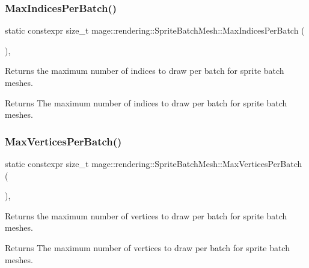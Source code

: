 \subsubsection{\texorpdfstring{Max\+Indices\+Per\+Batch()}{MaxIndicesPerBatch()}}
{\footnotesize\ttfamily static constexpr size\+\_\+t mage\+::rendering\+::\+Sprite\+Batch\+Mesh\+::\+Max\+Indices\+Per\+Batch (\begin{DoxyParamCaption}{ }\end{DoxyParamCaption})\hspace{0.3cm}{\ttfamily [static]}, {\ttfamily [noexcept]}}

Returns the maximum number of indices to draw per batch for sprite batch meshes.

\begin{DoxyReturn}{Returns}
The maximum number of indices to draw per batch for sprite batch meshes. 
\end{DoxyReturn}
\hypertarget{classmage_1_1rendering_1_1_sprite_batch_mesh_adad10e43a3ac2fb393bb423ec71c69bf}{}\label{classmage_1_1rendering_1_1_sprite_batch_mesh_adad10e43a3ac2fb393bb423ec71c69bf} 
\subsubsection{\texorpdfstring{Max\+Vertices\+Per\+Batch()}{MaxVerticesPerBatch()}}
{\footnotesize\ttfamily static constexpr size\+\_\+t mage\+::rendering\+::\+Sprite\+Batch\+Mesh\+::\+Max\+Vertices\+Per\+Batch (\begin{DoxyParamCaption}{ }\end{DoxyParamCaption})\hspace{0.3cm}{\ttfamily [static]}, {\ttfamily [noexcept]}}

Returns the maximum number of vertices to draw per batch for sprite batch meshes.

\begin{DoxyReturn}{Returns}
The maximum number of vertices to draw per batch for sprite batch meshes. 
\end{DoxyReturn}
\hypertarget{classmage_1_1rendering_1_1_sprite_batch_mesh_a19501a98accebf1a7ef53eb48980e750}{}\label{classmage_1_1rendering_1_1_sprite_batch_mesh_a19501a98accebf1a7ef53eb48980e750} 
